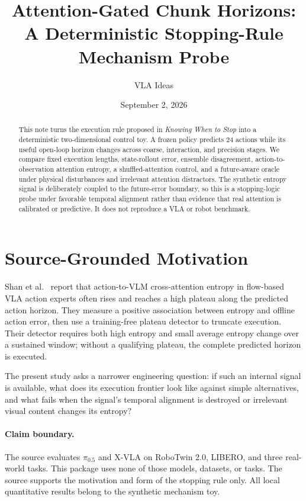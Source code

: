 \documentclass[11pt]{article}
\title{Attention-Gated Chunk Horizons: A Deterministic Stopping-Rule Mechanism Probe}
\author{VLA Ideas}
\date{September 2, 2026}
\begin{document}
\maketitle

\begin{abstract}
This note turns the execution rule proposed in \emph{Knowing When to Stop} into a deterministic two-dimensional control toy. A frozen policy predicts 24 actions while its useful open-loop horizon changes across coarse, interaction, and precision stages. We compare fixed execution lengths, state-rollout error, ensemble disagreement, action-to-observation attention entropy, a shuffled-attention control, and a future-aware oracle under physical disturbances and irrelevant attention distractors. The synthetic entropy signal is deliberately coupled to the future-error boundary, so this is a stopping-logic probe under favorable temporal alignment rather than evidence that real attention is calibrated or predictive. It does not reproduce a VLA or robot benchmark.
\end{abstract}

\section{Source-Grounded Motivation}
Shan et al.~\cite{knowing} report that action-to-VLM cross-attention entropy in flow-based VLA action experts often rises and reaches a high plateau along the predicted action horizon. They measure a positive association between entropy and offline action error, then use a training-free plateau detector to truncate execution. Their detector requires both high entropy and small average entropy change over a sustained window; without a qualifying plateau, the complete predicted horizon is executed.

The present study asks a narrower engineering question: if such an internal signal is available, what does its execution frontier look like against simple alternatives, and what fails when the signal's temporal alignment is destroyed or irrelevant visual content changes its entropy?

\paragraph{Claim boundary.}
The source evaluates $\pi_{0.5}$ and X-VLA on RoboTwin 2.0, LIBERO, and three real-world tasks. This package uses none of those models, datasets, or tasks. The source supports the motivation and form of the stopping rule only. All local quantitative results belong to the synthetic mechanism toy.
\end{document}
